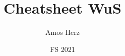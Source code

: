 \documentclass[a4paper,9pt]{extarticle}
\title{\vspace{-1cm}Cheatsheet WuS\vspace{-0.65cm}}
\author{Amos Herz\vspace{-0.5cm}}
\date{FS 2021}
\newcommand\1{\mathbbm{1}}
\begin{document}
\begin{multicols*}{3}

\maketitle













\end{multicols*}
\begin{small}

\end{small}

%
\end{document}
